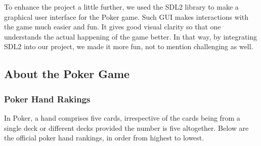 \vspace{0.5cm}

\hspace{1cm} To enhance the project a little further, we used the SDL2 library to make a graphical user interface for the Poker game. Such GUI makes interactions with the game much easier and fun. It gives good visual clarity so that one understands the actual happening of the game better. In that way, by integrating SDL2 into our project, we made it more fun, not to mention challenging as well.

\subsection{About the Poker Game}
\label{subsec:about-the-poker-game}

\subsubsection{Poker Hand Rakings}
\label{subsubsec:poker-hand-rankings}

\hspace{1cm} In Poker, a hand comprises five cards, irrespective of the cards being from a single deck or different decks provided the number is five altogether. Below are the official poker hand rankings, in order from highest to lowest.


